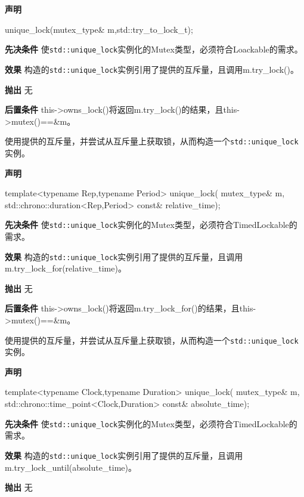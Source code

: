\textbf{声明}

\begin{cpp}
unique_lock(mutex_type& m,std::try_to_lock_t);
\end{cpp}

\textbf{先决条件}
使\texttt{std::unique\_lock}实例化的Mutex类型，必须符合Loackable的需求。

\textbf{效果}
构造的\texttt{std::unique\_lock}实例引用了提供的互斥量，且调用m.try\_lock()。

\textbf{抛出}
无

\textbf{后置条件}
this->owns\_lock()将返回m.try\_lock()的结果，且this->mutex()==\&m。


使用提供的互斥量，并尝试从互斥量上获取锁，从而构造一个\texttt{std::unique\_lock}实例。

\textbf{声明}

\begin{cpp}
template<typename Rep,typename Period>
unique_lock(
    mutex_type& m,
    std::chrono::duration<Rep,Period> const& relative_time);
\end{cpp}

\textbf{先决条件}
使\texttt{std::unique\_lock}实例化的Mutex类型，必须符合TimedLockable的需求。

\textbf{效果}
构造的\texttt{std::unique\_lock}实例引用了提供的互斥量，且调用m.try\_lock\_for(relative\_time)。

\textbf{抛出}
无

\textbf{后置条件}
this->owns\_lock()将返回m.try\_lock\_for()的结果，且this->mutex()==\&m。


使用提供的互斥量，并尝试从互斥量上获取锁，从而构造一个\texttt{std::unique\_lock}实例。

\textbf{声明}

\begin{cpp}
template<typename Clock,typename Duration>
unique_lock(
    mutex_type& m,
    std::chrono::time_point<Clock,Duration> const& absolute_time);
\end{cpp}

\textbf{先决条件}
使\texttt{std::unique\_lock}实例化的Mutex类型，必须符合TimedLockable的需求。

\textbf{效果}
构造的\texttt{std::unique\_lock}实例引用了提供的互斥量，且调用m.try\_lock\_until(absolute\_time)。

\textbf{抛出}
无

